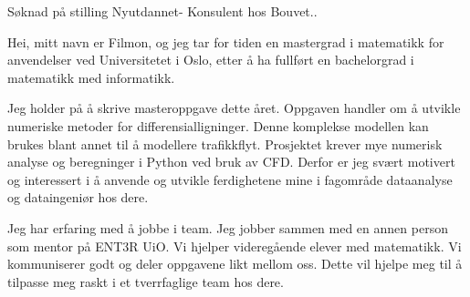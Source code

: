 \documentclass[a4paper,12pt]{letter}
\begin{document}
Søknad på stilling Nyutdannet- Konsulent hos Bouvet..

Hei, mitt navn er Filmon, og jeg tar for tiden en mastergrad i matematikk for anvendelser ved Universitetet i Oslo, etter å ha fullført en bachelorgrad i matematikk med informatikk.

Jeg holder på å skrive masteroppgave dette året. Oppgaven handler om å utvikle numeriske metoder for differensialligninger. Denne komplekse modellen kan brukes blant annet til å modellere trafikkflyt. Prosjektet krever mye numerisk analyse og beregninger i Python ved bruk av CFD. Derfor er jeg svært motivert og interessert i å anvende og utvikle ferdighetene mine i fagområde dataanalyse og dataingeniør hos dere.





Jeg har erfaring med å jobbe i team. Jeg jobber sammen med en annen person som mentor på ENT3R UiO. Vi hjelper videregående elever med matematikk. Vi kommuniserer godt og deler oppgavene likt mellom oss. Dette vil hjelpe meg til å tilpasse meg raskt i et tverrfaglige team hos dere.




\end{document}
